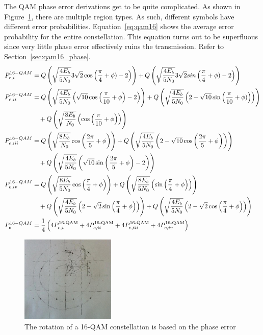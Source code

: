 \documentclass[]{article}
\newcommand{\rom}[1]{\uppercase\expandafter{\romannumeral#1}}
\begin{document}
The QAM phase error derivations get to be quite complicated.  As shown in Figure~\ref{fig:qamDraw}, there are multiple region types.  As such, different symbols have different error probabilities.  Equation~\ref{eq:qam16} shows the average error probability for the entire constellation.  This equation turns out to be superfluous since very little phase error effectively ruins the transmission.  Refer to Section~\ref{sec:qam16_phase}.
\begin{align}
P_{e,\rom{1}}^{16-QAM} &= Q\left(\sqrt{\frac{4E_b}{5N_0}}3\sqrt{2}\cos\left(\frac{\pi}{4}+\phi)-2\right)\right) + Q\left(\sqrt{\frac{4E_b}{5N_0}}3\sqrt{2}sin\left(\frac{\pi}{4}+\phi)-2\right)\right) \\
P_{e,\rom{2}}^{16-QAM} &= Q\left(\sqrt{\frac{4E_b}{5N_0}}\left(\sqrt{10}\cos\left(\frac{\pi}{10}+\phi\right)-2\right)\right)  +  Q\left(\sqrt{\frac{4E_b}{5N_0}}\left(2-\sqrt{10}\sin\left(\frac{\pi}{10}+\phi)\right)\right)\right) \nonumber \\
&\quad {} + Q\left(\sqrt{\frac{8E_b}{N_0}}\left(\cos\left(\frac{\pi}{10}+\phi\right)\right)\right) \\
P_{e,\rom{3}}^{16-QAM} &= Q\left(\sqrt{\frac{8E_b}{N_0}}\cos\left(\frac{2\pi}{5}+\phi\right)\right)  +  Q\left(\sqrt{\frac{4E_b}{5N_0}}\left(2-\sqrt{10}\cos\left(\frac{2\pi}{5}+\phi \right)\right)\right) \nonumber \\
&\quad {} + Q\left(\sqrt{\frac{4E_b}{5N_0}}\left(\sqrt{10}\sin\left(\frac{2\pi}{5}+\phi\right)-2\right)\right)\\
P_{e,\rom{4}}^{16-QAM} &= Q\left(\sqrt{\frac{8E_b}{5N_0}}\cos\left(\frac{\pi}{4}+\phi\right)\right)  +  Q\left(\sqrt{\frac{8E_b}{5N_0}}\left(\sin\left(\frac{\pi}{4}+\phi \right)\right)\right) \nonumber \\
&\quad {} + Q\left(\sqrt{\frac{4E_b}{5N_0}}\left(2-\sqrt{2}\sin\left(\frac{\pi}{4}+\phi\right)\right)\right) + Q\left(\sqrt{\frac{4E_b}{5N_0}}\left(2-\sqrt{2}\cos\left(\frac{\pi}{4}+\phi\right)\right)\right) \\
\label{eq:qam16}
P_{e}^{16-QAM} &= \frac{1}{4}\left( 4P_{e,\rom{1}}^{\text{16-QAM}} + 4P_{e,\rom{2}}^{\text{16-QAM}} + 4P_{e,\rom{3}}^{\text{16-QAM}} + 4P_{e,\rom{4}}^{\text{16-QAM}} \right)
\end{align}

\begin{figure}[H]
\centering
\hspace*{-2cm}\includegraphics[width=0.4\textwidth]{qamDraw.jpg}
\caption{The rotation of a 16-QAM constellation is based on the phase error \label{fig:qamDraw}}
\end{figure}
\end{document}
